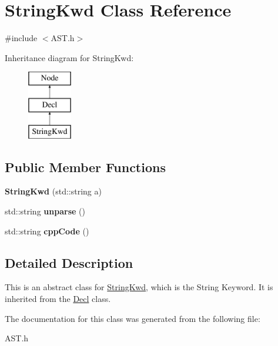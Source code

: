 \hypertarget{class_string_kwd}{}\section{String\+Kwd Class Reference}
\label{class_string_kwd}


{\ttfamily \#include $<$A\+S\+T.\+h$>$}

Inheritance diagram for String\+Kwd\+:\begin{figure}[H]
\begin{center}
\leavevmode
\includegraphics[height=3.000000cm]{class_string_kwd}
\end{center}
\end{figure}
\subsection*{Public Member Functions}
\begin{DoxyCompactItemize}
\item 
\hypertarget{class_string_kwd_a496b48d604ff90aaa38b8cd26a333231}{}{\bfseries String\+Kwd} (std\+::string a)\label{class_string_kwd_a496b48d604ff90aaa38b8cd26a333231}

\item 
\hypertarget{class_string_kwd_ab270eb08af110a7aaebc507e33e58948}{}std\+::string {\bfseries unparse} ()\label{class_string_kwd_ab270eb08af110a7aaebc507e33e58948}

\item 
\hypertarget{class_string_kwd_abad54134661e61e9ae4d5208e3e4b321}{}std\+::string {\bfseries cpp\+Code} ()\label{class_string_kwd_abad54134661e61e9ae4d5208e3e4b321}

\end{DoxyCompactItemize}


\subsection{Detailed Description}
This is an abstract class for \hyperlink{class_string_kwd}{String\+Kwd}, which is the String Keyword. It is inherited from the \hyperlink{class_decl}{Decl} class. 

The documentation for this class was generated from the following file\+:\begin{DoxyCompactItemize}
\item 
A\+S\+T.\+h\end{DoxyCompactItemize}
